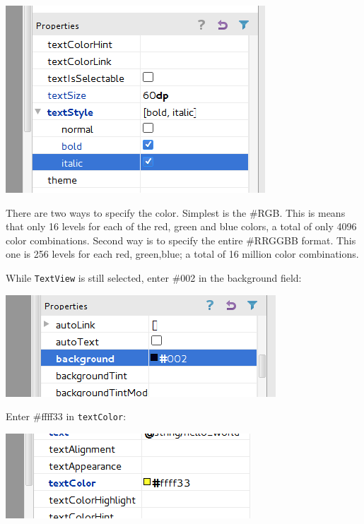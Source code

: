 \begin{center}
	\includegraphics[scale=0.4]{chapters/ch02/images/16_bold_italic}
\end{center}

There are two ways to specify the color. Simplest is the \#RGB. This is means that only 16 levels for each of the red, green and blue colors, a total of only 4096 color combinations. Second way is to specify the entire \#RRGGBB format. This one is 256 levels for each red, green,blue; a total of 16 million color combinations.

While \texttt{TextView} is still selected, enter \#002 in the background field:

\begin{center}
	\includegraphics[scale=0.4]{chapters/ch02/images/17_background}
\end{center}

Enter \#ffff33 in \texttt{textColor}:

\begin{center}
	\includegraphics[scale=0.4]{chapters/ch02/images/18_text_color}
\end{center}


